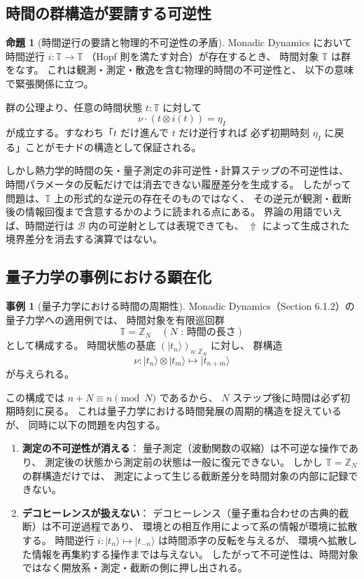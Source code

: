 \documentclass[11pt,a4paper]{ltjsarticle}
\newcommand{\metanegation}{\Uparrow}
\newcommand{\Bval}{\mathcal{B}}
\theoremstyle{definition}
\newtheorem{proposition}{命題}[section]
\newtheorem{example}{事例}[section]
\begin{document}
\subsection{時間の群構造が要請する可逆性}

\begin{proposition}[時間逆行の要請と物理的不可逆性の矛盾]
Monadic Dynamics において時間逆行 $i: \mathbb{T} \to \mathbb{T}$
（Hopf 則を満たす対合）が存在するとき、
時間対象 $\mathbb{T}$ は群をなす。
これは観測・測定・散逸を含む物理的時間の不可逆性と、
以下の意味で緊張関係に立つ。

群の公理より、任意の時間状態 $t: \mathbb{T}$ に対して
\[
\nu \cdot (t \otimes i(t)) = \eta_I
\]
が成立する。すなわち「$t$ だけ進んで $t$ だけ逆行すれば
必ず初期時刻 $\eta_I$ に戻る」ことがモナドの構造として保証される。

しかし熱力学的時間の矢・量子測定の非可逆性・計算ステップの不可逆性は、
時間パラメータの反転だけでは消去できない履歴差分を生成する。
したがって問題は、$\mathbb{T}$ 上の形式的な逆元の存在そのものではなく、
その逆元が観測・截断後の情報回復まで含意するかのように読まれる点にある。
界論の用語でいえば、時間逆行は $\Bval$ 内の可逆射としては表現できても、
$\metanegation$ によって生成された境界差分を消去する演算ではない。
\end{proposition}

\subsection{量子力学の事例における顕在化}

\begin{example}[量子力学における時間の周期性]
Monadic Dynamics（Section 6.1.2）の量子力学への適用例では、
時間対象を有限巡回群
\[
\mathbb{T} = \mathbb{Z}_N \quad (N \text{ : 時間の長さ})
\]
として構成する。
時間状態の基底 $(|t_n\rangle)_{n:\mathbb{Z}_N}$ に対し、
群構造
\[
\nu : |t_n\rangle \otimes |t_m\rangle \mapsto |t_{n+m}\rangle
\]
が与えられる。

この構成では $n + N \equiv n \pmod{N}$ であるから、
$N$ ステップ後に時間は必ず初期時刻に戻る。
これは量子力学における時間発展の周期的構造を捉えているが、
同時に以下の問題を内包する。

\begin{enumerate}
\item \textbf{測定の不可逆性が消える}：
  量子測定（波動関数の収縮）は不可逆な操作であり、
  測定後の状態から測定前の状態は一般に復元できない。
  しかし $\mathbb{T} = \mathbb{Z}_N$ の群構造だけでは、
  測定によって生じる截断差分を時間対象の内部に記録できない。

\item \textbf{デコヒーレンスが扱えない}：
  デコヒーレンス（量子重ね合わせの古典的截断）は不可逆過程であり、
  環境との相互作用によって系の情報が環境に拡散する。
  時間逆行 $i: |t_n\rangle \mapsto |t_{-n}\rangle$ は時間添字の反転を与えるが、
  環境へ拡散した情報を再集約する操作までは与えない。
  したがって不可逆性は、時間対象ではなく開放系・測定・截断の側に押し出される。
\end{enumerate}
\end{example}
\end{document}
